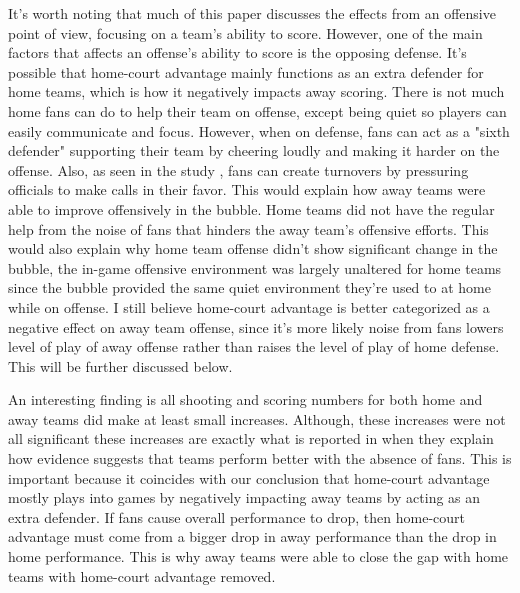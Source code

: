 \documentclass[10pt]{article}
\begin{document}
It's worth noting that much of this paper discusses the effects from an
offensive point of view, focusing on a team's ability to score. However, one of 
the main factors that affects an offense's ability to score is the opposing
defense. It's possible that home-court advantage mainly functions as an extra
defender for home teams, which is how it negatively impacts away scoring. There
is not much home fans can do to help their team on offense, except being quiet
so players can easily communicate and focus. However, when on defense, fans can
act as a "sixth defender" supporting their team by cheering loudly and making it
harder on the offense. Also, as seen in the study \cite{Price}, fans can 
create turnovers by pressuring officials to make calls in their favor.  
This would explain how away teams were able to improve
offensively in the bubble. Home teams did not have the regular help from the
noise of fans that hinders the away team's offensive efforts. This would also
explain why home team offense didn't show significant change in the bubble, the
in-game offensive environment was largely unaltered for home teams since the
bubble provided the same quiet environment they're used to at home while on
offense. I still believe home-court advantage is better categorized as a
negative effect on away team offense, since it's more likely
noise from fans lowers level of play of away offense rather than raises the level
of play of home defense. This will be further discussed below.

An interesting finding is all shooting and scoring numbers for both home and
away teams did make at least small increases. Although, these increases
were not all significant these increases are exactly what is reported in
\citet{Carron2005} when they explain how evidence suggests that teams perform
better with the absence of fans. This is important because it coincides with our
conclusion that home-court advantage mostly plays into games by negatively impacting 
away teams by acting as an extra defender. If fans cause overall performance to drop,
then home-court advantage must come from a bigger drop in away performance than the 
drop in home performance. This is why away teams were able to close the gap with 
home teams with home-court advantage removed.
\end{document}

